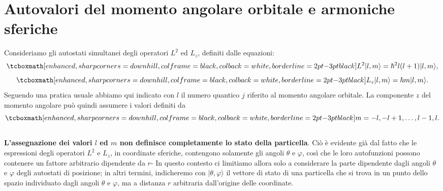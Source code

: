 \documentclass[a4paper,12pt,oneside]{book}
\begin{document}
\section[Autovalori del momento angolare orbitale e armoniche sferiche]{Autovalori del momento angolare orbitale e armoniche sferiche}
Consideriamo gli autostati simultanei degli operatori $L^2$ ed $L_z$, definiti dalle equazioni:
	\begin{equation}
		 \tcboxmath[enhanced, sharp corners=downhill, colframe=black, colback=white, borderline={2pt}{-3pt}{black}]{
			L^2 \vert l, m \rangle = \hbar ^2 l(l+1) \vert l, m \rangle ,\label{eq:cap17_6}
		}
	\end{equation}
	\begin{equation}
		\tcboxmath[enhanced, sharp corners=downhill, colframe=black, colback=white, borderline={2pt}{-3pt}{black}]{
L_z \vert l, m \rangle = \hbar m \vert l, m \rangle
\label{eq:cap17_7}.
		}
	\end{equation}
Seguendo una pratica usuale abbiamo qui indicato con $l$ il numero quantico $j$ riferito al momento angolare orbitale. La componente $z$ del momento angolare può quindi assumere i valori definiti da
	\begin{equation}
		\tcboxmath[enhanced, sharp corners=downhill, colframe=black, colback=white, borderline={2pt}{-3pt}{black}]{
			m = -l, -l+1, \dots,l-1, l .
			}
	\end{equation}\\

\textbf{L'assegnazione dei valori $l$ ed $m$ non definisce completamente lo stato della particella}. Ciò è evidente già dal fatto che le espressioni degli operatori $L^2$ e $L_z$, in coordinate sferiche, contengono solamente gli angoli $\theta$ e $\varphi$, così che le loro autofunzioni possono contenere un fattore arbitrario dipendente da $r$- In questo contesto ci limitiamo allora solo a considerare la parte dipendente dagli angoli $\theta$ e $\varphi$ degli autostati di posizione; in altri termini, indicheremo con $\vert \theta ,\varphi\rangle$ il vettore di stato di una particella che si trova in un punto dello spazio individuato dagli angoli $\theta $ e $\varphi$, ma a distanza $r$ arbitraria dall'origine delle coordinate.\\
\end{document}
